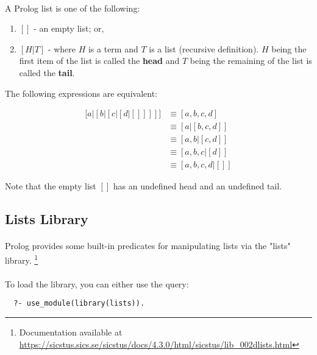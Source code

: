 \documentclass{article}
\begin{document}
\begin{multicols}{2}
  \paragraph{} A Prolog list is one of the following:
  
  \begin{enumerate}
  \item $[]$ - an empty list; or,
  \item $[H|T]$ - where $H$ is a term and $T$ is a list (recursive definition). $H$ being the first item of the list is called the {\bf head} and $T$ being the remaining of the list is called the {\bf tail}.
  \end{enumerate}
  
  \noindent The following expressions are equivalent:
  
  \begin{equation*}
  \begin{aligned}
  \big [ a \vert [ b \vert [ c \vert [ d \vert []]]] \big] & \equiv [a,b,c,d] \\
  & \equiv [a|[b,c,d]] \\
  & \equiv [a,b|[c,d]] \\
  & \equiv [a,b,c|[d]] \\
  & \equiv [a,b,c,d|[]]
  \end{aligned}
  \end{equation*}  
  
  \noindent Note that the empty list $[]$ has an undefined head and an undefined tail.  
  
  \subsection{Lists Library}
  
  \paragraph{} Prolog provides some built-in predicates for manipulating lists via the "lists" library. \footnote{Documentation available at \url{https://sicstus.sics.se/sicstus/docs/4.3.0/html/sicstus/lib_002dlists.html}}
  
  \paragraph{} To load the library, you can either use the query:
  
  \begin{lstlisting}
  ?- use_module(library(lists)).
  \end{lstlisting}
  

\end{multicols}
\end{document}
